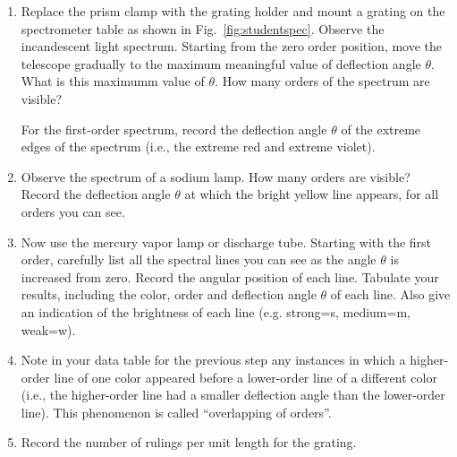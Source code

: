 \begin{enumerate}

\item Replace the prism clamp with the grating holder and mount a grating on the
  spectrometer table as shown in Fig.~\ref{fig:studentspec}.  Observe the
  incandescent light spectrum.  Starting from the zero order position, move the
  telescope gradually to the maximum meaningful value of deflection angle
  ${\theta}$. What is this maximumm value of $\theta$.  How many orders of the
  spectrum are visible?

  For the first-order spectrum, record the deflection angle ${\theta}$ of the
  extreme edges of the spectrum (i.e., the extreme red and extreme
  violet).

\item Observe the spectrum of a sodium lamp.  How many orders are
visible? Record the deflection angle ${\theta}$ at which the bright
yellow line appears, for all orders you can see.

\item Now use the mercury vapor lamp or discharge tube. Starting
  with the first order, carefully list all the spectral lines you can see as the
  angle ${\theta}$ is increased from zero.  Record the angular position of each
  line. Tabulate your results, including the color, order and deflection angle
  ${\theta}$ of each line.  Also give an indication of the brightness of each
  line (e.g. strong=s, medium=m, weak=w).

\item Note in your data table for the previous step any instances in which a
  higher-order line of one color appeared before a lower-order line of a
  different color (i.e., the higher-order line had a smaller deflection angle
  than the lower-order line).  This phenomenon is called ``overlapping of
  orders''.

\item Record the number of rulings per unit length for the grating.
\end{enumerate}

